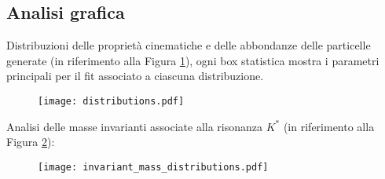 \documentclass[a4paper,11pt]{article}
\begin{document}
\clearpage

\subsection{Analisi grafica}

Distribuzioni delle proprietà cinematiche e delle abbondanze delle particelle generate (in riferimento alla Figura \ref{fig:distribuzioni}), ogni box statistica mostra i parametri principali per il fit associato a ciascuna distribuzione.

\begin{figure}[h!]
    \centering
    \texttt{[image: distributions.pdf]}
    \caption{}
    \label{fig:distribuzioni}
\end{figure}


Analisi delle masse invarianti associate alla risonanza \( K^* \) (in riferimento alla Figura \ref{fig:kstar}):

\begin{figure}[h!]
    \centering
    \texttt{[image: invariant\_mass\_distributions.pdf]}
    \caption{}
    \label{fig:kstar}
\end{figure}
\end{document}
